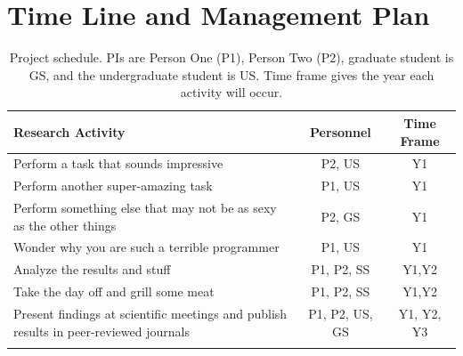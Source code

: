 \documentclass[nsfdescription]{nsfproposal}
\begin{document}

\section{Time Line and Management Plan}

\begin{table}[H]
	\renewcommand{\arraystretch}{0}
	\caption{Project schedule.  PIs are Person One (P1), Person Two (P2), graduate student is GS, and the undergraduate student is US. Time frame gives the year 		each activity will occur.}
	\scriptsize
	\begin{tabularx}{\textwidth}{Y c c }
		\hline
		\hline
		\textbf{Research Activity} & \textbf{Personnel} & \textbf{Time Frame}\\
		\hline
		Perform a task that sounds impressive & P2, US & Y1 \T\\
		Perform another super-amazing task & P1, US & Y1 \T\\
		Perform something else that may not be as sexy as the other things & P2, GS & Y1 \T\\
		Wonder why you are such a terrible programmer & P1, US & Y1 \T\\
		Analyze the results and stuff & P1, P2, SS & Y1,Y2 \T\ake the day off and grill some meat & P1, P2, SS & Y1,Y2 \T\\
		Present findings at scientific meetings and publish results in peer-reviewed journals & P1, P2, US, GS & Y1, Y2, Y3\T\B\\
		\hline
		\hline
		\label{table1}
	\end{tabularx}
\end{table}
\end{document}
